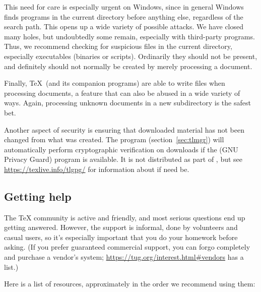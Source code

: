 \documentclass{article}
\begin{document}
This need for care is especially urgent on Windows, since in general
Windows finds programs in the current directory before anything else,
regardless of the search path.  This opens up a wide variety of possible
attacks.  We have closed many holes, but undoubtedly some remain,
especially with third-party programs.  Thus, we recommend checking for
suspicious files in the current directory, especially executables
(binaries or scripts).  Ordinarily they should not be present, and
definitely should not normally be created by merely processing a document.

Finally, \TeX\ (and its companion programs) are able to write files when
processing documents, a feature that can also be abused in a wide
variety of ways.  Again, processing unknown documents in a new
subdirectory is the safest bet.

Another aspect of security is ensuring that downloaded material has not
been changed from what was created. The  program
(section~\ref{sec:tlmgr}) will automatically perform cryptographic
verification on downloads if the  (GNU Privacy Guard) program
is available. It is not distributed as part of \TL, but see
\url{https://texlive.info/tlgpg/} for information about  if
need be.

\subsection{Getting help}
\label{sec:help}

The \TeX{} community is active and friendly, and most serious questions
end up getting answered.  However, the support is informal, done by
volunteers and casual users, so it's especially important that you do
your homework before asking.  (If you prefer guaranteed commercial
support, you can forgo \TL{} completely and purchase a vendor's system;
\url{https://tug.org/interest.html#vendors} has a list.)

Here is a list of resources, approximately in the order we recommend
using them:
\end{document}
